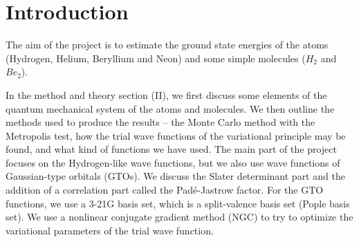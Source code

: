 \documentclass[twocolumns, a4paper,11pt,fleqn]{extarticle}
\title{}
\begin{document}

\section{Introduction} 
The aim of the project is to estimate the ground state energies of the
atoms (Hydrogen, Helium, Beryllium and Neon) and some simple molecules ($H_2$ and $Be_2$).

In the method and theory section (II), 
we first discuss some elements of the quantum mechanical system 
of the atoms and molecules.
We then outline the methods used to produce the results --
the Monte Carlo method with the Metropolis test, how the trial wave functions
of the variational principle may be found, and what kind of functions we have used.
The main part of the project focuses on the Hydrogen-like wave functions,
but we also use wave functions of Gaussian-type orbitals (GTOs).
We discuss the Slater determinant part and the addition of a
correlation part called the Pad\'e-Jastrow factor.
For the GTO functions, we use a 3-21G basis set, which is
a split-valence basis set (Pople basis set).
We use a nonlinear conjugate gradient method (NGC) to try to optimize the
variational parameters of the trial wave function.
\end{document}

